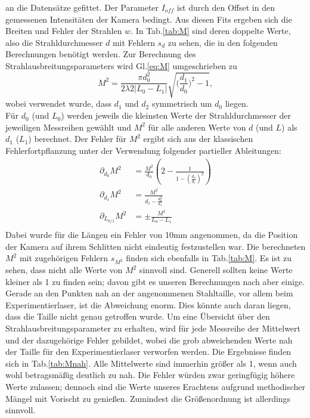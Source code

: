 an die Datensätze gefittet. Der Parameter $I_{off}$ ist durch den Offset in den gemessenen Intensitäten der Kamera bedingt. Aus diesen Fits ergeben sich die Breiten und Fehler der 
Strahlen $w$. In Tab.\ref{tab:M} sind deren doppelte Werte, also die Strahldurchmesser $d$ mit Fehlern $s_d$ zu sehen, die in den folgenden Berechnungen benötigt werden.
Zur Berechnung des Strahlausbreitungsparameters wird Gl.\ref{eq:M} umgeschrieben zu
\begin{equation*}
    M^2 = \frac{\pi d_0^2}{2 \lambda 2|L_0-L_1| } \sqrt{\biggl(\frac{d_1}{d_0}\biggl)^2-1},
\end{equation*}
wobei verwendet wurde, dass $d_1$ und $d_2$ symmetrisch um $d_0$ liegen.\\
Für $d_0$ (und $L_0$) werden jeweils die kleinsten Werte der Strahldurchmesser der jeweiligen Messreihen gewählt und $M^2$ für alle anderen Werte von $d$ (und $L$) als 
$d_1$ ($L_1$) berechnet. Der Fehler für $M^2$ ergibt sich aus der klassischen Fehlerfortpflanzung unter der Verwendung folgender partieller Ableitungen:
\begin{align*}
    \partial_{d_0}M^2 &= \frac{M^2}{d_0}(2-\frac{1}{1-(\frac{d_0}{d_1})^2}) \\
    \partial_{d_1}M^2 &= \frac{M^2}{d_1 - \frac{d_0^2}{d_1}} \\
    \partial_{L_{0/1}}M^2 &= \pm \frac{M^2}{L_0-L_1} \\
\end{align*}
Dabei wurde für die Längen ein Fehler von 10mm angenommen, da die Position der Kamera auf ihrem Schlitten nicht eindeutig festzustellen war. 
Die berechneten $M^2$ mit zugehörigen Fehlern $s_{M^2}$ finden sich ebenfalls in Tab.\ref{tab:M}.
Es ist zu sehen, dass nicht alle Werte von $M^2$ sinnvoll sind. Generell sollten keine Werte kleiner als 1 zu finden sein; davon gibt es unseren Berechnungen nach aber einige. 
Gerade an den Punkten nah an der angenommenen Stahltaille, vor allem beim Experimentierlaser, ist die Abweichung enorm. Dies könnte auch daran liegen, dass die Taille nicht genau getroffen wurde. Um eine Übersicht 
über den Strahlausbreitungsparameter zu erhalten, wird für jede Messreihe der Mittelwert und der dazugehörige Fehler gebildet, wobei die grob abweichenden Werte nah der Taille für den 
Experimentierlaser verworfen werden. Die Ergebnisse finden sich in Tab.\ref{tab:Mnah}. Alle Mittelwerte sind immerhin größer als 1, wenn auch wohl betragsmäßig deutlich zu nah. 
Die Fehler würden zwar geringfügig höhere Werte zulassen; dennoch sind die Werte unseres Erachtens aufgrund methodischer Mängel mit Vorischt zu genießen. Zumindest die 
Größenordnung ist allerdings sinnvoll.


